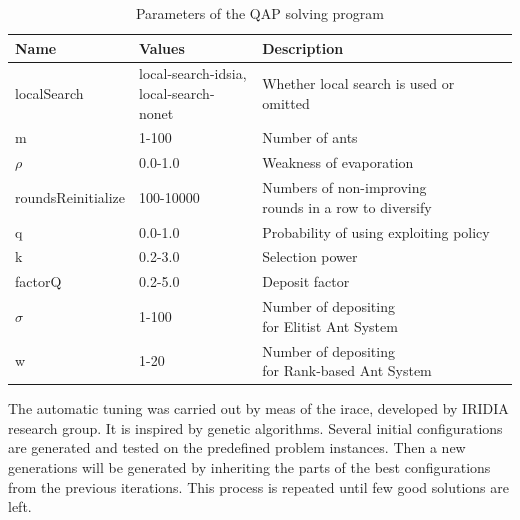 \documentclass[12pt]{article}
\begin{document}
\begin{table}[H]
\centering
\caption{Parameters of the QAP solving program}
\label{tbl:parameters}
\begin{tabular}{|l|l|l|}
\hline
\textbf{Name}         & \textbf{Values}                       & \textbf{Description}                                  \\ \hline
localSearch           & \makecell{local-search-idsia,\\ local-search-nonet} & Whether local search is used or omitted               \\ \hline
m                     & 1-100                                 & Number of ants                                        \\ \hline
$\rho$   & 0.0-1.0                               & Weakness of evaporation                               \\ \hline
roundsReinitialize    & 100-10000                             & \makecell[l]{Numbers of non-improving \\rounds in a row to diversify} \\ \hline
q                     & 0.0-1.0                               & Probability of using exploiting policy                \\ \hline
k                     & 0.2-3.0                               & Selection power                                       \\ \hline
factorQ               & 0.2-5.0                               & Deposit factor                                        \\ \hline
$\sigma$ & 1-100                                 & \makecell[l]{Number of depositing \\for Elitist Ant System}           \\ \hline
w                     & 1-20                                  & \makecell[l]{Number of depositing \\for Rank-based Ant System}        \\ \hline
\end{tabular}
\end{table}

The automatic tuning was carried out by meas of the irace, developed by IRIDIA research group. It is inspired by genetic algorithms. Several initial configurations are generated and tested on the predefined problem instances. Then a new generations will be generated by inheriting the parts of the best configurations from the previous iterations. This process is repeated until few good solutions are left.
\end{document}
